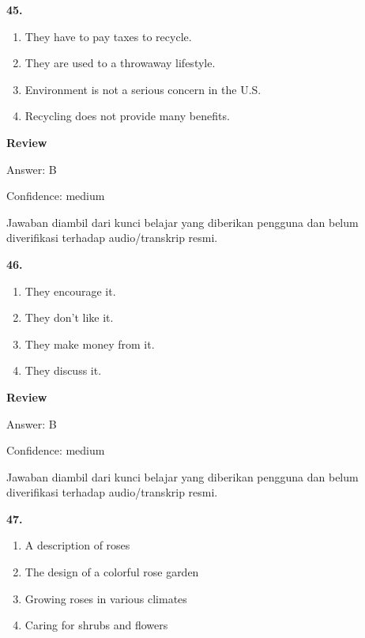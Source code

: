 \documentclass[12pt]{article}
\begin{document}
\noindent\textbf{45.}
\begin{enumerate}[label=(\Alph*),leftmargin=*,itemsep=0.2em]
\item They have to pay taxes to recycle.
\item They are used to a throwaway lifestyle.
\item Environment is not a serious concern in the U.S.
\item Recycling does not provide many benefits.
\end{enumerate}
\par
\begingroup
\setlength{\parskip}{0pt}
\setlength{\parindent}{0pt}
\textbf{Review}\par
Answer: B\par
Confidence: medium\par
Jawaban diambil dari kunci belajar yang diberikan pengguna dan belum diverifikasi terhadap audio/transkrip resmi.\par
\endgroup
\par
\vspace{0.25\baselineskip}
\noindent\textbf{46.}
\begin{enumerate}[label=(\Alph*),leftmargin=*,itemsep=0.2em]
\item They encourage it.
\item They don't like it.
\item They make money from it.
\item They discuss it.
\end{enumerate}
\par
\begingroup
\setlength{\parskip}{0pt}
\setlength{\parindent}{0pt}
\textbf{Review}\par
Answer: B\par
Confidence: medium\par
Jawaban diambil dari kunci belajar yang diberikan pengguna dan belum diverifikasi terhadap audio/transkrip resmi.\par
\endgroup
\par
\vspace{0.25\baselineskip}
\noindent\textbf{47.}
\begin{enumerate}[label=(\Alph*),leftmargin=*,itemsep=0.2em]
\item A description of roses
\item The design of a colorful rose garden
\item Growing roses in various climates
\item Caring for shrubs and flowers
\end{enumerate}
\par
\end{document}
